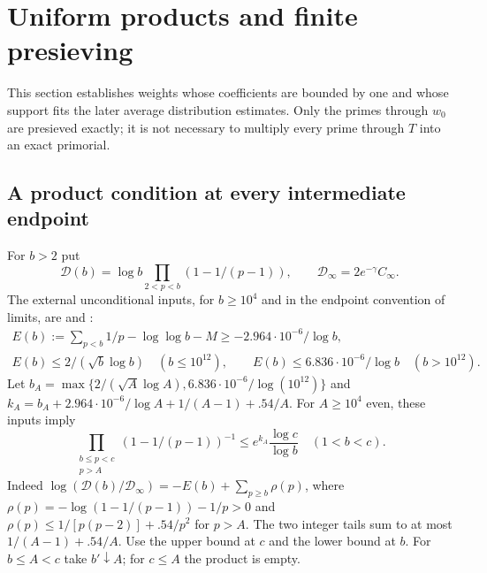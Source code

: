 \documentclass[11pt]{article}
\theoremstyle{remark}\newtheorem{remark}[theorem]{Remark}
\begin{document}
\section{Uniform products and finite presieving}\label{sec:presieve}
This section establishes weights whose coefficients are bounded by one
and whose support fits the later average distribution estimates.
Only the primes through $w_0$ are presieved exactly; it is not necessary
to multiply every prime through $T$ into an exact primorial.

\subsection{A product condition at every intermediate endpoint}
For $b>2$ put
\[
\mathscr D(b)=\log b\prod_{2<p<b}(1-1/(p-1)),\qquad
\mathscr D_\infty=2e^{-\gamma}C_\infty.
\]
The external unconditional inputs, for $b\ge10^4$ and in the endpoint
convention of limits, are \cite[Lemma 16 (finite upper bound) and
Lemma 17 (lower bound)]{BJS} and \cite[Lemma 3.2]{JS}:
\begin{gather*}
E(b):=\sum_{p<b}1/p-\log\log b-M\ge-2.964\cdot10^{-6}/\log b,\\
E(b)\le 2/(\sqrt b\log b)\quad(b\le10^{12}),\qquad
E(b)\le6.836\cdot10^{-6}/\log b\quad(b>10^{12}).
\end{gather*}
Let $b_A=\max\{2/(\sqrt A\log A),6.836\cdot10^{-6}/\log(10^{12})\}$
and $k_A=b_A+2.964\cdot10^{-6}/\log A+1/(A-1)+.54/A$.
For $A\ge10^4$ even, these inputs imply
\begin{equation}\label{eq:originalproduct}
\prod_{\substack{b\le p<c\\p>A}}(1-1/(p-1))^{-1}
\le e^{k_A}\frac{\log c}{\log b}\quad(1<b<c).
\end{equation}
Indeed $\log(\mathscr D(b)/\mathscr D_\infty)
=-E(b)+\sum_{p\ge b}\rho(p)$, where
$\rho(p)=-\log(1-1/(p-1))-1/p>0$ and
$\rho(p)\le1/[p(p-2)]+.54/p^2$ for $p>A$.
The two integer tails sum to at most $1/(A-1)+.54/A$.
Use the upper bound at $c$ and the lower bound at $b$.
For $b\le A<c$ take $b'\downarrow A$; for $c\le A$ the product is empty.
\end{document}

